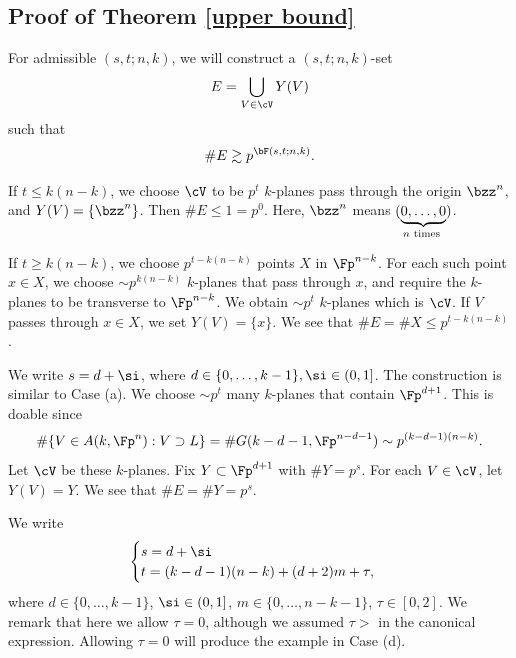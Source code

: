 \subsection{Proof of Theorem \ref{upper bound}}\hfill

For admissible $(s,t;n,k)$, we will construct a $(s,t;n,k)$-set 
\[ E=\bigcup_{V\in\cV}Y(V) \]
such that
\[ \#E\gtrsim p^{\bF(s,t;n,k)}. \]


If $t\le k(n-k)$, we choose $\cV$ to be $p^t$ $k$-planes pass through the origin $\bzz^n$, and $Y(V)=\{\bzz^n\}$. Then $\#E\le 1=p^0$. Here, $\bzz^n$ means $(\underbrace{0,\dots,0}_{n \textup{~times~}})$.

If $t\ge k(n-k)$, we choose $p^{t-k(n-k)}$ points $X$ in $\Fp^{n-k}$. For each such point $x\in X$, we choose $\sim p^{k(n-k)}$ $k$-planes that pass through $x$, and require the $k$-planes to be transverse to $\Fp^{n-k}$. We obtain $\sim p^t$ $k$-planes which is $\cV$. If $V$ passes through $x\in X$, we set $Y(V)=\{x\}$. We see that $\#E=\#X\le p^{t-k(n-k)}$.

\bigskip


We write $s=d+\si$, where $d\in \{0,\dots,k-1\}, \si\in(0,1]$.
The construction is similar to Case (a). We choose $\sim p^t$ many $k$-planes that contain $\Fp^{d+1}$. This is doable since 
\[ \#\{ V\in A(k,\Fp^n): V\supset L \}=\#G(k-d-1,\Fp^{n-d-1})\sim p^{(k-d-1)(n-k)}. \]
Let $\cV$ be these $k$-planes. Fix $Y\subset \Fp^{d+1}$ with $\#Y=p^s$. For each $V\in \cV$, let $Y(V)=Y$. We see that $\#E=\#Y=p^s$.





\bigskip

\fbox{Case (c): $s\in (0,k], t\in ((k-d-1)(n-k),(k+1)(n-k)]$}

We write 
\begin{equation}\label{stformula}
    \begin{cases}
        s=d+\si\\
        t=(k-d-1)(n-k)+(d+2)m+\tau,
    \end{cases}
\end{equation} 
    where $d\in\{0,\dots,k-1\}$, $\si\in (0,1]$,  $m\in\{0,\dots,n-k-1\}$, $\tau\in [0,2]$. We remark that here we allow $\tau=0$, although we assumed $\tau>$ in the canonical expression. Allowing $\tau=0$ will produce the example in Case (d).

